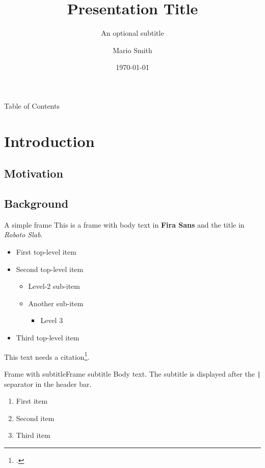 \documentclass[aspectratio=169, 12pt]{beamer}
\title{Presentation Title}
\subtitle{An optional subtitle}
\author[M. Smith]{Mario Smith}
\institute{University · Department of Computer Science}
\date{\today}
\begin{document}
\begin{frame}[plain]
	\titlepage
\end{frame}

\begin{frame}{Table of Contents}
	\tableofcontents
\end{frame}

\section{Introduction}
\subsection{Motivation}
\subsection{Background}

\begin{frame}{A simple frame}
	This is a frame with body text in \textbf{Fira Sans} and the title in
	\textit{Roboto Slab}.

	\begin{itemize}
		\item First top-level item
		\item Second top-level item
		      \begin{itemize}
			      \item Level-2 sub-item
			      \item Another sub-item
			            \begin{itemize}
				            \item Level 3
			            \end{itemize}
		      \end{itemize}
		\item Third top-level item
	\end{itemize}

	\medskip
	This text needs a citation\footcite{knuth1984literate}.
\end{frame}

\begin{frame}{Frame with subtitle}{Frame subtitle}
	Body text. The subtitle is displayed after the \texttt{|} separator
	in the header bar.

	\begin{enumerate}
		\item First item
		\item Second item
		\item Third item
	\end{enumerate}
\end{frame}
\end{document}

